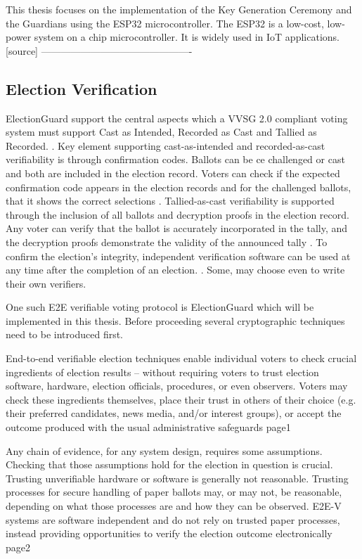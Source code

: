 This thesis focuses on the implementation of the Key Generation Ceremony and the Guardians using the ESP32 microcontroller. The ESP32 is a low-cost, low-power system on a chip microcontroller. It is widely used in IoT applications. [source]
----------------------------------------------
\subsection{Election Verification}
ElectionGuard support the central aspects which a VVSG 2.0 compliant voting system must support Cast as Intended, Recorded as Cast and Tallied as Recorded. \cite[17]{eg-paper}. Key element supporting cast-as-intended and recorded-as-cast verifiability is through confirmation codes. Ballots can be ce challenged or cast and both are included in the election record. Voters can check if the expected confirmation code appears in the election records and for the challenged ballots, that it shows the correct selections \cite[18]{eg-paper}. Tallied-as-cast verifiability is supported through the inclusion of all ballots and decryption proofs in the election record. Any voter can verify that the ballot is accurately incorporated in the tally, and the decryption proofs demonstrate the validity of the announced tally \cite[18]{eg-paper}. To confirm the election's integrity, independent verification software can be used at any time after the completion of an election. \cite[6]{eg-paper}. Some, may choose even to write their own verifiers.  



One such E2E verifiable voting protocol is ElectionGuard which will be implemented in this thesis. Before proceeding several cryptographic techniques need to be introduced first.

End-to-end verifiable election techniques enable individual voters to check crucial ingredients
of election results – without requiring voters to trust election software, hardware, election
officials, procedures, or even observers. Voters may check these ingredients themselves, place their
trust in others of their choice (e.g. their preferred candidates, news media, and/or interest groups),
or accept the outcome produced with the usual administrative safeguards
page1

Any chain of evidence, for any system design, requires some assumptions. Checking that those
assumptions hold for the election in question is crucial. Trusting unverifiable hardware or software is
generally not reasonable. Trusting processes for secure handling of paper ballots may, or may not,
be reasonable, depending on what those processes are and how they can be observed. E2E-V
systems are software independent and do not rely on trusted paper processes, instead providing
opportunities to verify the election outcome electronically
page2

